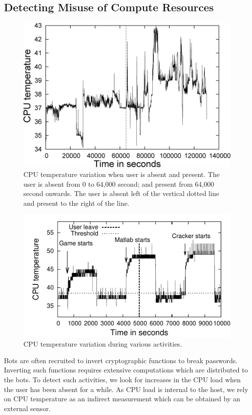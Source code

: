 \subsection{Detecting Misuse of Compute Resources} \label{sec:sensor-passwordcrack}

\begin{figure}[tb]
\centering
\includegraphics[width=0.8\columnwidth]{sensor/normal-cat.png}
\caption{CPU temperature variation when user is absent and present. 
The user is absent from 0 to 64,000 second;
and present from 64,000 second onwards. The user is absent left of
the vertical dotted line and present to the right of the line.
} 
\label{fig:temp-norm}
\end{figure}


\begin{figure}[tb]
\centering
\includegraphics[width=1.0\columnwidth]{sensor/temp-activities.pdf}
\caption{CPU temperature variation during various
activities. } \label{fig:temp-activities}
\end{figure}

Bots are often recruited to invert cryptographic functions to break
passwords. Inverting such functions requires extensive computations
which are distributed to the bots. To detect such activities, we
look for increases in the CPU load when the user has been absent for a
while. As CPU load is internal to the host,
we rely on CPU temperature as an indirect measurement which can
be obtained by an external sensor.

